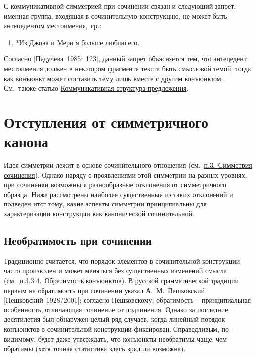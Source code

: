 С коммуникативной симметрией при сочинении связан и следующий запрет:
именная группа, входящая в сочинительную конструкцию, не может быть
антецедентом местоимения,~ср.:

\begin{enumerate}
\def\labelenumi{(\arabic{enumi})}
\setcounter{enumi}{24}
\item
  *Из Джона и Мери я больше люблю его.
\end{enumerate}

Согласно {[}Падучева~1985:~123{]}, данный запрет объясняется тем, что
антецедент местоимения должен в некотором фрагменте текста быть
смысловой темой, тогда как конъюнкт может составить тему лишь вместе с
другим конъюнктом. См.~также статью \underline{Коммуникативная структура
предложения}.

\hypertarget{ux43eux442ux441ux442ux443ux43fux43bux435ux43dux438ux44f-ux43eux442-ux441ux438ux43cux43cux435ux442ux440ux438ux447ux43dux43eux433ux43e-ux43aux430ux43dux43eux43dux430}{%
\section{Отступления от симметричного
канона}\label{ux43eux442ux441ux442ux443ux43fux43bux435ux43dux438ux44f-ux43eux442-ux441ux438ux43cux43cux435ux442ux440ux438ux447ux43dux43eux433ux43e-ux43aux430ux43dux43eux43dux430}}

Идея симметрии лежит в основе сочинительного отношения
(см.~\underline{п.3.~Симметрия сочинения}). Однако наряду с проявлениями
этой симметрии на разных уровнях, при сочинении возможны и разнообразные
отклонения от симметричного образца. Ниже рассмотрены наиболее
существенные из таких отклонений и подведен итог тому, какие аспекты
симметрии принципиальны для характеризации конструкции как канонической
сочинительной.

\hypertarget{ux43dux435ux43eux431ux440ux430ux442ux438ux43cux43eux441ux442ux44c-ux43fux440ux438-ux441ux43eux447ux438ux43dux435ux43dux438ux438}{%
\subsection{Необратимость при
сочинении}\label{ux43dux435ux43eux431ux440ux430ux442ux438ux43cux43eux441ux442ux44c-ux43fux440ux438-ux441ux43eux447ux438ux43dux435ux43dux438ux438}}

Традиционно считается, что порядок элементов в сочинительной конструкции
часто произволен и может меняться без существенных изменений смысла
(см.~\underline{п.3.3.4.~Обратимость конъюнктов}). В русской
грамматической традиции первым на обратимость при сочинении указал
А.~М.~Пешковский {[}Пешковский~1928/2001{]}; согласно Пешковскому,
обратимость -- принципиальная особенность, отличающая сочинение от
подчинения. Однако за последние десятилетия был обнаружен целый ряд
случаев, когда линейный порядок конъюнктов в сочинительной конструкции
фиксирован. Справедливым, по-видимому, будет даже утверждать, что
конъюнкты необратимы чаще, чем обратимы (хотя точная статистика здесь
вряд ли возможна).

